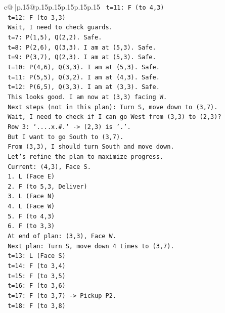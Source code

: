 \documentclass{article}
\begin{document}
{\begin{supertabular}{c@{$\;$}|p{.15\linewidth}@{}p{.15\linewidth}p{.15\linewidth}p{.15\linewidth}p{.15\linewidth}p{.15\linewidth}}
{{{\texttt{   t=11: F (to 4,3)} \\
\texttt{   t=12: F (to 3,3)} \\
\texttt{   Wait, I need to check guards.} \\
\texttt{   t=7: P(1,5), Q(2,2). Safe.} \\
\texttt{   t=8: P(2,6), Q(3,3). I am at (5,3). Safe.} \\
\texttt{   t=9: P(3,7), Q(2,3). I am at (5,3). Safe.} \\
\texttt{   t=10: P(4,6), Q(3,3). I am at (5,3). Safe.} \\
\texttt{   t=11: P(5,5), Q(3,2). I am at (4,3). Safe.} \\
\texttt{   t=12: P(6,5), Q(3,3). I am at (3,3). Safe.} \\
\texttt{   This looks good. I am now at (3,3) facing W.} \\
\texttt{   Next steps (not in this plan): Turn S, move down to (3,7).} \\
\texttt{   Wait, I need to check if I can go West from (3,3) to (2,3)?} \\
\texttt{   Row 3: `....x.\#.` {-}> (2,3) is '.'.} \\
\texttt{   But I want to go South to (3,7).} \\
\texttt{   From (3,3), I should turn South and move down.} \\
\texttt{   Let's refine the plan to maximize progress.} \\
\texttt{   Current: (4,3), Face S.} \\
\texttt{   1. L (Face E)} \\
\texttt{   2. F (to 5,3, Deliver)} \\
\texttt{   3. L (Face N)} \\
\texttt{   4. L (Face W)} \\
\texttt{   5. F (to 4,3)} \\
\texttt{   6. F (to 3,3)} \\
\texttt{   At end of plan: (3,3), Face W.} \\
\texttt{   Next plan: Turn S, move down 4 times to (3,7).} \\
\texttt{   t=13: L (Face S)} \\
\texttt{   t=14: F (to 3,4)} \\
\texttt{   t=15: F (to 3,5)} \\
\texttt{   t=16: F (to 3,6)} \\
\texttt{   t=17: F (to 3,7) {-}> Pickup P2.} \\
\texttt{   t=18: F (to 3,8)} \\
}}}
\end{supertabular}}
\end{document}
